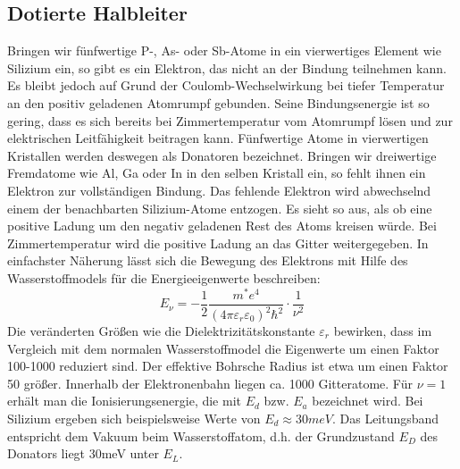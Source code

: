 \documentclass[11pt]{article}
\begin{document}
\subsection{Dotierte Halbleiter}
Bringen wir fünfwertige P-, As- oder Sb-Atome in ein vierwertiges Element wie
Silizium ein, so gibt es ein Elektron, das nicht an der Bindung teilnehmen kann.
Es bleibt jedoch auf Grund der Coulomb-Wechselwirkung bei tiefer Temperatur an
den positiv geladenen Atomrumpf gebunden. Seine Bindungsenergie ist so gering,
dass es sich bereits bei Zimmertemperatur vom Atomrumpf lösen und zur
elektrischen Leitfähigkeit beitragen kann. Fünfwertige Atome in vierwertigen
Kristallen werden deswegen als Donatoren bezeichnet. Bringen wir dreiwertige
Fremdatome wie Al, Ga oder In in den selben Kristall ein, so fehlt ihnen ein
Elektron zur vollständigen Bindung. Das fehlende Elektron wird abwechselnd einem
der benachbarten Silizium-Atome entzogen. Es sieht so aus, als ob eine positive
Ladung um den negativ geladenen Rest des Atoms kreisen würde. Bei
Zimmertemperatur wird die positive Ladung an das Gitter weitergegeben. In
einfachster Näherung lässt sich die Bewegung des Elektrons mit Hilfe des
Wasserstoffmodels für die Energieeigenwerte beschreiben:
\begin{equation}
  E_\nu=-\frac{1}{2}\frac{m^*e^4}{(4\pi\varepsilon_r\varepsilon_0)^2\hbar^2}
  \cdot\frac{1}{\nu^2}
\end{equation}
Die veränderten Größen wie die Dielektrizitätskonstante $\varepsilon_r$ bewirken,
dass im Vergleich mit dem normalen Wasserstoffmodel die Eigenwerte um einen
Faktor 100-1000 reduziert sind. Der effektive Bohrsche Radius ist etwa um einen
Faktor 50 größer. Innerhalb der Elektronenbahn liegen ca. 1000 Gitteratome. Für
$\nu=1$ erhält man die Ionisierungsenergie, die mit $E_d$ bzw. $E_a$ bezeichnet
wird. Bei Silizium ergeben sich beispielsweise Werte von $E_d\approx 30meV$. Das
Leitungsband entspricht dem Vakuum beim Wasserstoffatom, d.h. der Grundzustand
$E_D$ des Donators liegt 30meV unter $E_L$.
\end{document}
